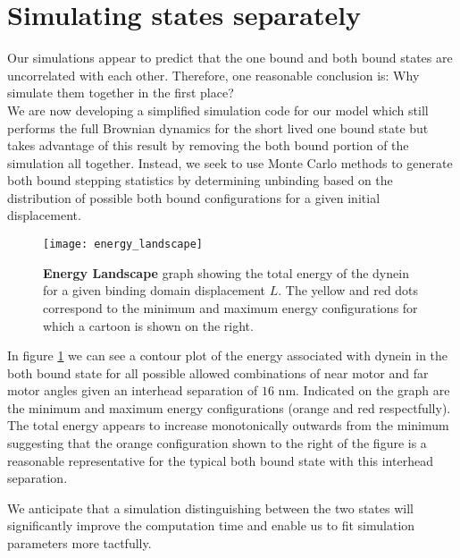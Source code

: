 \section{Simulating states separately}
Our simulations appear to predict that the one bound and both bound states are uncorrelated with each other. Therefore, one reasonable conclusion is: Why simulate them together in the first place? \\

We are now developing a simplified simulation code for our model which still performs the full Brownian dynamics for the short lived one bound state but takes advantage of this result by removing the both bound portion of the simulation all together. Instead, we seek to use Monte Carlo methods to generate both bound stepping statistics by determining unbinding based on the distribution of possible both bound configurations for a given initial displacement. \\

\begin{figure}[!hbt]
	\centering
	\texttt{[image: energy\_landscape]}
	\caption[Energy Landscape]{\textbf{Energy Landscape} graph showing the total energy of the dynein for a given binding domain displacement $L$. The yellow and red dots correspond to the minimum and maximum energy configurations for which a cartoon is shown on the right.}
	\label{fig:energy_landscape}
\end{figure}
In figure \ref{fig:energy_landscape} we can see a contour plot of the energy associated with dynein in the both bound state for all possible allowed combinations of near motor and far motor angles given an interhead separation of $16$ nm. Indicated on the graph are the minimum and maximum energy configurations (orange and red respectfully). The total energy appears to increase monotonically outwards from the minimum suggesting that the orange configuration shown to the right of the figure is a reasonable representative for the typical both bound state with this interhead separation. 

We anticipate that a simulation distinguishing between the two states will significantly improve the computation time and enable us to fit simulation parameters more tactfully. 
			

\vspace{10em}
